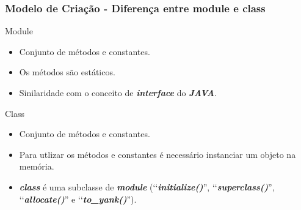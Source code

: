 \begin{frame}
\frametitle{Modelo de Criação - Diferença entre module e class}

  \begin{block}{Module}

   \begin{itemize}

    \item Conjunto de métodos e constantes.

    \item Os métodos são estáticos.

    \item Sinilaridade com o conceito de \emph{\textbf{interface}} do \emph{\textbf{JAVA}}.

   \end{itemize}

  \end{block}

  \begin{block}{Class}

   \begin{itemize}

    \item Conjunto de métodos e constantes.

    \item Para utlizar os métodos e constantes é necessário instanciar um objeto na memória.

    \item \emph{\textbf{class}} é uma subclasse de \emph{\textbf{module}} (‘‘\emph{\textbf{initialize()}}'',
    ‘‘\emph{\textbf{superclass()}}'', ‘‘\emph{\textbf{allocate()}}'' e ‘‘\emph{\textbf{to\_yank()}}'').

   \end{itemize}

  \end{block}

\end{frame}


